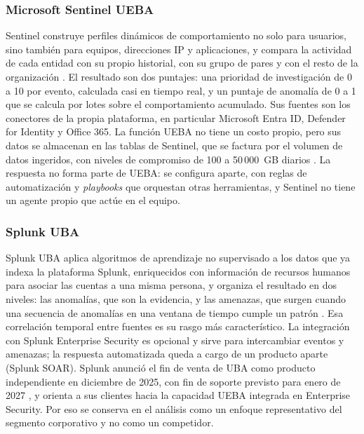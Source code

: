 \subsubsection{Microsoft Sentinel UEBA}\label{sec:ea-sentinel}
Sentinel construye perfiles dinámicos de comportamiento no solo para usuarios, sino también para equipos, direcciones IP y aplicaciones, y compara la actividad de cada entidad con su propio historial, con su grupo de pares y con el resto de la organización \parencite{MicrosoftSentinelUEBA}. El resultado son dos puntajes: una prioridad de investigación de 0 a 10 por evento, calculada casi en tiempo real, y un puntaje de anomalía de 0 a 1 que se calcula por lotes sobre el comportamiento acumulado. Sus fuentes son los conectores de la propia plataforma, en particular Microsoft Entra ID, Defender for Identity y Office 365. La función UEBA no tiene un costo propio, pero sus datos se almacenan en las tablas de Sentinel, que se factura por el volumen de datos ingeridos, con niveles de compromiso de 100 a 50\,000~GB diarios \parencite{MicrosoftSentinelPricing}. La respuesta no forma parte de UEBA: se configura aparte, con reglas de automatización y \emph{playbooks} que orquestan otras herramientas, y Sentinel no tiene un agente propio que actúe en el equipo.

\subsubsection{Splunk UBA}\label{sec:ea-splunk}
Splunk UBA aplica algoritmos de aprendizaje no supervisado a los datos que ya indexa la plataforma Splunk, enriquecidos con información de recursos humanos para asociar las cuentas a una misma persona, y organiza el resultado en dos niveles: las anomalías, que son la evidencia, y las amenazas, que surgen cuando una secuencia de anomalías en una ventana de tiempo cumple un patrón \parencite{SplunkUBADocs}. Esa correlación temporal entre fuentes es su rasgo más característico. La integración con Splunk Enterprise Security es opcional y sirve para intercambiar eventos y amenazas; la respuesta automatizada queda a cargo de un producto aparte (Splunk SOAR). Splunk anunció el fin de venta de UBA como producto independiente en diciembre de 2025, con fin de soporte previsto para enero de 2027 \parencite{Splunk2025UBAEoS}, y orienta a sus clientes hacia la capacidad UEBA integrada en Enterprise Security. Por eso se conserva en el análisis como un enfoque representativo del segmento corporativo y no como un competidor.

